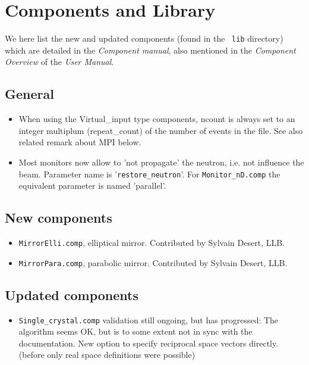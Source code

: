 \section{Components and Library}
\label{s:new-features:components}
 
We here list the new and updated components (found in the \MCS\ \verb+lib+ directory)
which are detailed in the {\it Component manual}, also mentioned in
the {\it Component Overview} of the {\it User Manual}.
\subsection{General}
\begin{itemize}
\item When using the Virtual\_input type components, \-\-ncount is always set to an integer multiplum 
     (repeat\_count) of the number of events in the file. See also
     related remark about MPI below.
\item Most monitors now allow to 'not propagate' the neutron, i.e. not influence the beam. Parameter name
     is '\verb+restore_neutron+'. For \verb+Monitor_nD.comp+ the equivalent
     parameter is named 'parallel'.
\end{itemize}
\subsection{New components}
\begin{itemize}
\item \verb+MirrorElli.comp+, elliptical mirror. Contributed by Sylvain Desert, LLB.
\item \verb+MirrorPara.comp+, parabolic mirror. Contributed by Sylvain Desert, LLB.
\end{itemize}
\subsection{Updated components}
\begin{itemize}
\item \verb+Single_crystal.comp+ validation still ongoing, but has progressed: The algorithm seems OK, but is to some
     extent not in sync with the documentation. New option to specify reciprocal space vectors directly.
     (before only real space definitions were possible)
\end{itemize}

